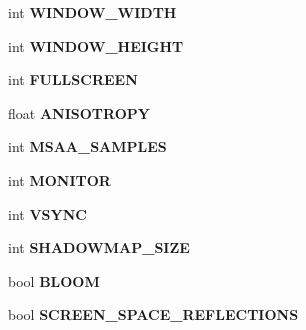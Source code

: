 \begin{DoxyCompactItemize}
\item 
int {\bfseries W\+I\+N\+D\+O\+W\+\_\+\+W\+I\+D\+TH}\hypertarget{class_program_data_a194382c9991456626eabfaac620d1593}{}\label{class_program_data_a194382c9991456626eabfaac620d1593}

\item 
int {\bfseries W\+I\+N\+D\+O\+W\+\_\+\+H\+E\+I\+G\+HT}\hypertarget{class_program_data_ae329abb19c18265f43fe6fc4719f116c}{}\label{class_program_data_ae329abb19c18265f43fe6fc4719f116c}

\item 
int {\bfseries F\+U\+L\+L\+S\+C\+R\+E\+EN}\hypertarget{class_program_data_ade841fd154be761a88668bce99a24dc7}{}\label{class_program_data_ade841fd154be761a88668bce99a24dc7}

\item 
float {\bfseries A\+N\+I\+S\+O\+T\+R\+O\+PY}\hypertarget{class_program_data_afdbcfdfce3153071fba3f9f3b38a3d7f}{}\label{class_program_data_afdbcfdfce3153071fba3f9f3b38a3d7f}

\item 
int {\bfseries M\+S\+A\+A\+\_\+\+S\+A\+M\+P\+L\+ES}\hypertarget{class_program_data_a390427f4cf8f8cdaa61e51c7ad4ec0ba}{}\label{class_program_data_a390427f4cf8f8cdaa61e51c7ad4ec0ba}

\item 
int {\bfseries M\+O\+N\+I\+T\+OR}\hypertarget{class_program_data_a7630d404f89116a3780ddcd9a43f94af}{}\label{class_program_data_a7630d404f89116a3780ddcd9a43f94af}

\item 
int {\bfseries V\+S\+Y\+NC}\hypertarget{class_program_data_ae8a78e0f45b9f7c26e6ba3d53a9d2e0d}{}\label{class_program_data_ae8a78e0f45b9f7c26e6ba3d53a9d2e0d}

\item 
int {\bfseries S\+H\+A\+D\+O\+W\+M\+A\+P\+\_\+\+S\+I\+ZE}\hypertarget{class_program_data_a54c66c5b37646a69b1a164511a1e8447}{}\label{class_program_data_a54c66c5b37646a69b1a164511a1e8447}

\item 
bool {\bfseries B\+L\+O\+OM}\hypertarget{class_program_data_a0be8976ca0152b554215ee1b149e500e}{}\label{class_program_data_a0be8976ca0152b554215ee1b149e500e}

\item 
bool {\bfseries S\+C\+R\+E\+E\+N\+\_\+\+S\+P\+A\+C\+E\+\_\+\+R\+E\+F\+L\+E\+C\+T\+I\+O\+NS}\hypertarget{class_program_data_aa4bb9ab9f71a82689ed95ba7cdcd463d}{}\label{class_program_data_aa4bb9ab9f71a82689ed95ba7cdcd463d}


\end{DoxyCompactItemize}
